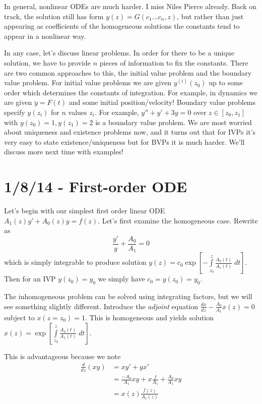 \documentclass[10pt]{report}
\newcommand{\rd}[2]{\frac{d#1}{d#2}}
\begin{document}
In general, nonlinear ODEs are much harder. I miss Niles Pierce already. Back on track, the solution still has form $y(z) = G(c_1\dots c_n, z)$, but rather than just appearing as coefficients of the homogeneous solutions the constants tend to appear in a nonlinear way. 

In any case, let's discuss linear problems. In order for there to be a unique solution, we have to provide $n$ pieces of information to fix the constants. There are two common approaches to this, the initial value problem and the boundary value problem. For initial value problems we are given $y^{(i)}(z_0)$ up to some order which determines the constants of integration. For example, in dynamics we are given $\ddot{y} = F(t)$ and some initial position/velocity! Boundary value problems specify $y(z_i)$ for $n$ values $z_i$. For example, $y'' + y' + 3y = 0$ over $z \in [z_0, z_1]$ with $y(z_0) = 1, y(z_1) = 2$ is a boundary value problem. We are most worried about uniqueness and existence problems now, and it turns out that for IVPs it's very easy to state existence/uniqueness but for BVPs it is much harder. We'll discuss more next time with examples!

\chapter{1/8/14 - First-order ODE}

Let's begin with our simplest first order linear ODE $A_1(z)y' + A_0(z)y = f(z)$. Let's first examine the homogeneous case. Rewrite as
$$\frac{y'}{y} + \frac{A_0}{A_1} = 0$$
which is simply integrable to produce solution $y(z) = c_0\exp\left[ -\displaystyle\int\limits_{z_0}^{z}\frac{A_0(t)}{A_1(t)}\;dt \right]$. Then for an IVP $y(z_0) = y_0$ we simply have $c_0 = y(z_0) = y_0$.

The inhomogeneous problem can be solved using integrating factors, but we will see something slightly different. Introduce the \emph{adjoint} equation $\rd{x}{z} - \frac{A_0}{A_1}x(z) = 0$ subject to $x(z=z_0) = 1$. This is homogeneous and yields solution $x(z) = \exp\left[ \displaystyle\int\limits_{z_0}^{z}\frac{A_0(t)}{A_1(t)}\;dt \right]$.

This is advantageous because we note
\begin{align}
    \rd{}{z}(xy) &= xy' + yx'\\
    &= \frac{-A_0}{A_1}xy + x\frac{f}{A_1} + \frac{A_0}{A_1}xy\\
    &= x(z) \frac{f(z)}{A_1(z)}
    \label{1.8.adjoint}
\end{align}
\end{document}
